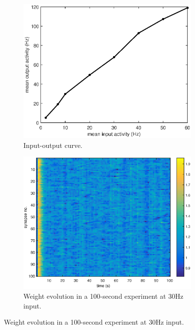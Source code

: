 \documentclass[a4paper,12pt]{report}
\theoremstyle{definition}
\begin{document}
\begin{figure}
    \centering
    \begin{subfigure}[t]{0.5\textwidth}
            \includegraphics[width=\textwidth]{figures/fig_iocurve_epsp3.eps}
            \caption{Input-output curve.}
            \label{fig:iocurve}
    \end{subfigure}%
    \begin{subfigure}[t]{0.5\textwidth}
            \includegraphics[width=\textwidth]{figures/fig_weights_raster_30Hz}
            \caption{Weight evolution in a 100-second experiment at 30Hz input.}
            \label{fig:weightsraster}
    \end{subfigure}%
\end{figure}
\end{document}
